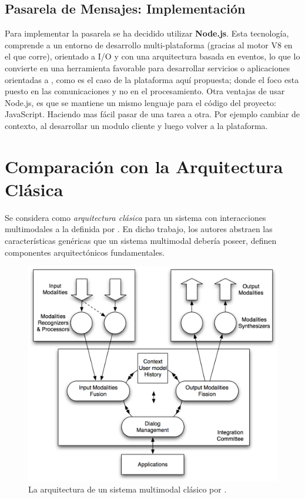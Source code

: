 \subsection{Pasarela de Mensajes: Implementación} \label{sec:arq_ours_code}
Para implementar la pasarela se ha decidido utilizar \textbf{Node.js}. Esta tecnología, comprende a un entorno de desarrollo multi-plataforma (gracias al motor V8 en el que corre), orientado a I/O y con una arquitectura basada en eventos, lo que lo convierte en una herramienta favorable para desarrollar servicios o aplicaciones orientadas a , como es el caso de la plataforma aquí propuesta; donde el foco esta puesto en las comunicaciones y no en el procesamiento.
Otra ventajas de usar Node.js, es que se mantiene un mismo lenguaje para el código del proyecto: JavaScript. Haciendo mas fácil pasar de una tarea a otra. Por ejemplo cambiar de contexto, al desarrollar un modulo cliente y luego volver a la plataforma.

\section{Comparación con la Arquitectura Clásica} \label{sec:arq_others}
Se considera como \emph{arquitectura clásica} para un sistema con interacciones multimodales a la definida por \citet{dumas2009multimodal}. En dicho trabajo, los autores abstraen las características genéricas que un sistema multimodal debería poseer, definen componentes arquitectónicos fundamentales. 

\begin{center}
  \begin{figure}[h]
    \includegraphics[scale=1,width=\textwidth]{gfx/arq_dumas}
    \caption{La arquitectura de un sistema multimodal clásico por  \citet{dumas2009multimodal}.}
    \label{fig:arq_others_dumas}
  \end{figure}
\end{center}

